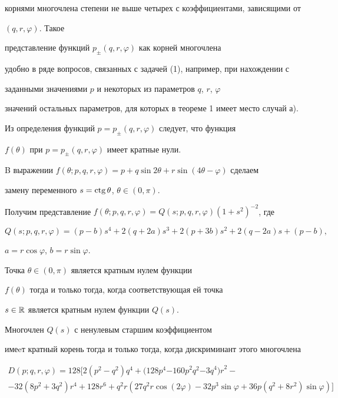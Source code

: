 корнями многочлена степени не выше четырех с коэффициентами, зависящими от


$(q,r,\varphi)$. Такое


представление функций $p_\pm (q,r,\varphi)$ как корней многочлена


удобно в ряде вопросов, связанных с задачей (1), например, при нахождении с


заданными значениями $p$ и некоторых из параметров $q$, $r$, $\varphi$


значений остальных параметров, для которых в теореме 1 имеет место случай а).





Из определения функций $p=p_\pm (q,r,\varphi)$ следует, что функция


$f(\theta)$ при $p=p_\pm (q,r,\varphi)$ имеет кратные нули.


B выражении $f(\theta ;p,q,r,\varphi)=


p+q\sin 2\theta+r\sin (4\theta - \varphi)$ сделаем


замену переменного $s=\operatorname{ctg} \theta$, $\theta\in (0,\pi)$.


Получим представление $f(\theta ;p,q,r,\varphi)=


{Q(s;p,q,r,\varphi)}{(1+s^2)^{-2}}$, где


$$


Q(s;p,q,r,\varphi)=(p - b)s^4+2(q+2a)s^3+2(p+3b)s^2+


2(q - 2a)s+(p - b),


$$


$a=r\cos \varphi$, $b=r\sin \varphi$.


Точка $\theta\in (0,\pi)$ является кратным нулем функции


$f(\theta)$ тогда и только тогда, когда соответствующая ей точка


$s \in \Bbb R$ является кратным нулем функции $Q(s)$.


Многочлен $Q(s)$ с ненулевым старшим коэффициентом


имеeт кратный корень тогда и только тогда, когда дискриминант этого многочлена


\begin{multline}


D(p;q,r,\varphi)=128[2(p^2 - q^2)q^4


+(128p^4 { - 160p}^{ 2} { q}^{ 2}


{ - 3q}^{ 4} { )r}^{ 2} - \\


- 32(8p^2+3q^2)r^4+128r^6+q^2 r(27q^2 r\cos (2\varphi)


- 32p^3 \sin \varphi+36p(q^2+8r^2)\sin \varphi)]


\end{multline}


